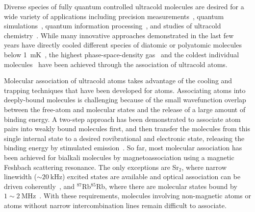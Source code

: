 \documentclass[aps,prl,twocolumn,10pt,superscriptaddress]{revtex4-1}
\begin{document}

Diverse species of fully quantum controlled  ultracold molecules are desired
for a wide variety of applications including precision measurements~\cite{
  Kondov2019,Nick_and_Ivan2017, PhysRevA.101.042504, Andreev2018,
  PhysRevLett.119.153001, hudson2011},
quantum simulations~\cite{Micheli2006, Yao2018, Wall2015, wall2015realizing},
quantum information processing~\cite{DeMille2002, Ni2018, Hudson2018, Lin2019},
and studies of ultracold chemistry~\cite{Bala2016,Hu1111,Segev2019,deJongh626}.
While many innovative approaches demonstrated in the last few years
have directly cooled different species of diatomic or polyatomic molecules
below 1~mK~\cite{Norrgard2016,Anderegg2018, Mitra1366, PhysRevX.10.021049,
  PhysRevLett.121.013202, Truppe2017},
the highest phase-space-density gas~\cite{Demarco2018} and
the coldest individual molecules~\cite{Zhang2020,He331}
have been achieved through the association of ultracold atoms.

Molecular association of ultracold atoms takes advantage of the cooling and trapping techniques
that have been developed for atoms.
Associating atoms into deeply-bound molecules is challenging
because of the small wavefunction overlap between the free-atom and molecular states
and the release of a large amount of binding energy.
A two-step approach has been demonstrated to associate atom pairs
into weakly bound molecules first,
and then transfer the molecules from this single internal state
to a desired rovibrational and electronic state,
releasing the binding energy by stimulated emission~\cite{Danzl2008, Ni2008, Lang2008,
  Takekoshi2014, Molony2014, Park2015, Guo2016, Kondov2019, Voges2020}.
So far, most molecular association has been achieved for bialkali molecules
by magnetoassociation using a magnetic Feshbach scattering resonance.
The only exceptions are Sr$_2$, where narrow linewidth ($\sim 20~\mathrm{kHz}$) excited states
are available and optical association can be driven coherently~\cite{Reinaudi2012,Stellmer2012},
and $^{87}$Rb$^{85}$Rb,
where there are molecular states bound by $1\sim2~\mathrm{MHz}$~\cite{He331}.
With these requirements, molecules involving non-magnetic atoms
or atoms without narrow intercombination lines remain difficult to associate.
\end{document}
